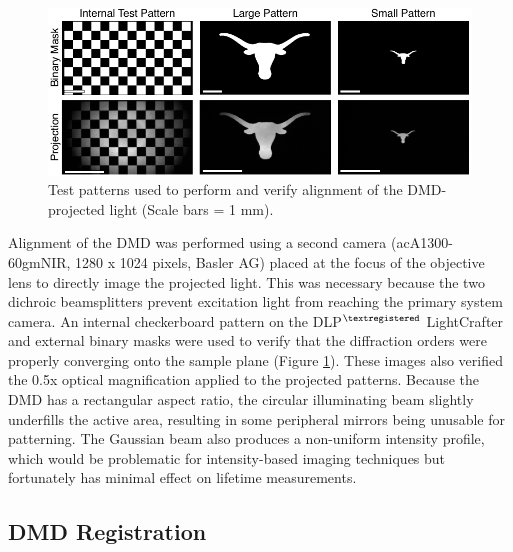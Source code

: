 \begin{figure}
    \includegraphics{figures/chapter_2/dmdalignment.pdf}
    \caption{
        \label{fig:dmdalignment}
        Test patterns used to perform and verify alignment of the DMD-projected light (Scale bars = 1 mm).
    }
\end{figure}

Alignment of the DMD was performed using a second camera (acA1300-60gmNIR, 1280 x 1024 pixels, Basler AG) placed at the focus of the objective lens to directly image the projected light. This was necessary because the two dichroic beamsplitters prevent excitation light from reaching the primary system camera. An internal checkerboard pattern on the DLP$^{\tiny{\textregistered}}$ LightCrafter and external binary masks were used to verify that the diffraction orders were properly converging onto the sample plane (Figure \ref{fig:dmdalignment}). These images also verified the 0.5x optical magnification applied to the projected patterns. Because the DMD has a rectangular aspect ratio, the circular illuminating beam slightly underfills the active area, resulting in some peripheral mirrors being unusable for patterning. The Gaussian beam also produces a non-uniform intensity profile, which would be problematic for intensity-based imaging techniques but fortunately has minimal effect on lifetime measurements.

\subsection{DMD Registration} \label{ssec:dmd_registration}

